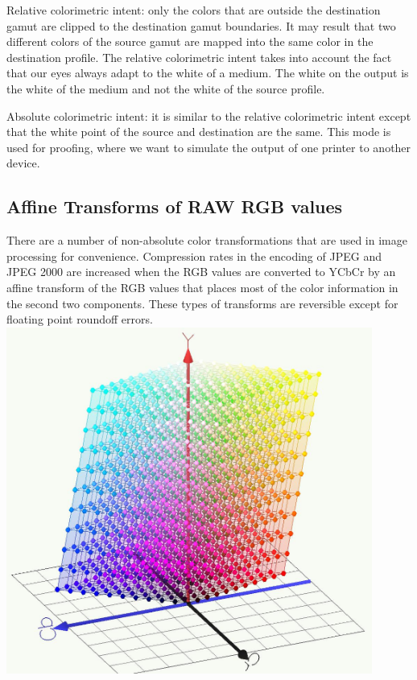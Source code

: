 Relative colorimetric intent: only the colors that are outside the destination gamut are
clipped to the destination gamut boundaries. It may result that two different colors of
the source gamut are mapped into the same color in the destination profile. The
relative colorimetric intent takes into account the fact that our eyes always adapt to the white of a medium. The white on the output is the white of the medium and not the
white of the source profile.

Absolute colorimetric intent: it is similar to the relative colorimetric intent except that
the white point of the source and destination are the same. This mode is used for
proofing, where we want to simulate the output of one printer to another device.

\subsection{Affine Transforms of RAW RGB values}
There are a number of non-absolute color transformations that are used in image processing for convenience.  Compression rates in the encoding of JPEG and JPEG 2000 are increased when the RGB values are converted to YCbCr by an affine transform of the RGB values that places most of the color information in the second two components.
These types of transforms are reversible except for floating point roundoff errors.
\includegraphics[width=12.0cm]{ColorPaper/RGB_TO_YCBCR.jpg}

